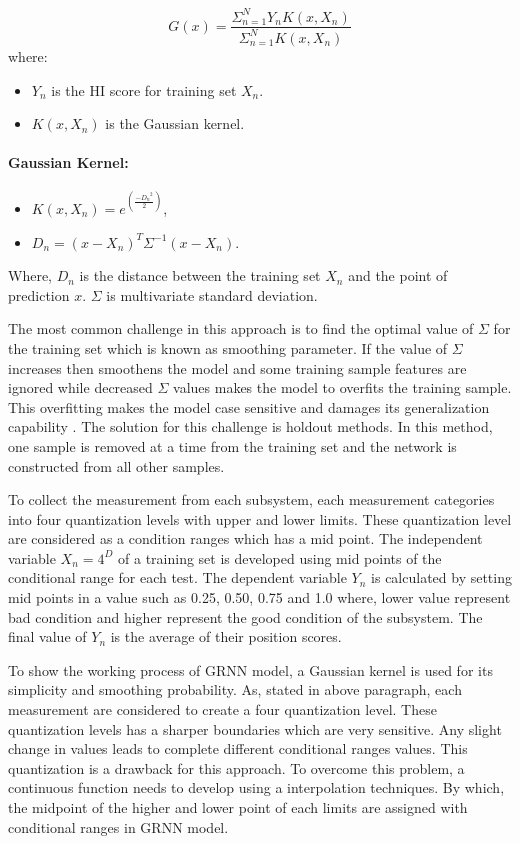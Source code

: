 \begin{equation} \label{Equation_1}
    G(x)=\frac{\Sigma_{n=1}^N Y_n K(x,X_n)}{\Sigma_{n=1}^N K(x,X_n)}
\end{equation}
where:
\begin{itemize}
    \item $Y_n$ is the HI score for training set $X_n$.
    \item $K(x,X_n)$ is the Gaussian kernel.
\end{itemize}
\paragraph{Gaussian Kernel:}
\begin{itemize}
    \item $K(x,X_n)=e^(\frac{{-D_n}^2}{2})$,
    \item $D_n = (x-X_n)^T \Sigma^{-1} (x-X_n)$.
\end{itemize}
 
Where, $D_n$ is the distance between the training set $X_n$ and the point of prediction $x$. $\Sigma$ is multivariate
standard deviation.

The most common challenge in this approach is to find the optimal value of $\Sigma$ for the training set which
is known as smoothing parameter. If the value of $\Sigma$ increases then smoothens the model and some training
sample features are ignored while decreased $\Sigma$ values makes the model to overfits the training sample. This
overfitting makes the model case sensitive  and damages its generalization capability \cite{Islam2018CalculatingAH}.
The solution for this challenge is holdout methods. In this method, one sample is removed at a time from the training
set and the network is constructed from all other samples.

To collect the measurement from each subsystem, each measurement categories into four quantization levels with upper
and lower limits. These quantization level are considered as a condition ranges which has a mid point. The independent
variable $X_n=4^D$ of a training  set is developed using mid points of the conditional range for each test. The dependent
variable $Y_n$ is calculated by setting mid points in a value such as 0.25, 0.50, 0.75 and 1.0 where, lower value
represent bad condition and higher represent the good condition of the subsystem. The final value of $Y_n$ is the average
of their position scores.



To show the working process of GRNN model, a Gaussian kernel is used for its simplicity and smoothing probability. As,
stated in above paragraph, each measurement are considered to create a four quantization level. These quantization levels
has a sharper boundaries which are very sensitive. Any slight change in values leads to complete different conditional
ranges values.
This quantization is a drawback for this approach. To overcome this problem, a continuous function
needs to develop using a interpolation techniques. By which, the midpoint of the higher and lower point of each limits
are assigned with conditional ranges in GRNN model.

